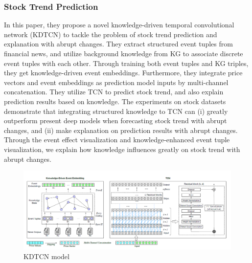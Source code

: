 \subsubsection{Stock Trend Prediction}
In this paper, they propose a novel knowledge-driven temporal convolutional network (KDTCN) to tackle the problem of stock trend prediction and explanation with abrupt changes. They extract structured event tuples from financial news, and utilize background knowledge from KG to associate discrete event tuples with each other. Through training both event tuples and KG triples, they get knowledge-driven event embeddings. Furthermore, they integrate price vectors and event embeddings as prediction model inputs by multi-channel concatenation. They utilize TCN to predict stock trend, and also explain prediction results based on knowledge. The experiments on stock datasets demonstrate that integrating structured knowledge to TCN can (i) greatly outperform present deep models when forecasting stock trend with abrupt changes, and (ii) make explanation on prediction results with abrupt changes. Through the event effect visualization and knowledge-enhanced event tuple visualization, we explain how knowledge influences greatly on stock trend with abrupt changes.

\begin{figure}[H]
    \includegraphics[width=\textwidth]{../Figures/ch_3_11_1.png}
    \caption{KDTCN model}
\end{figure}

